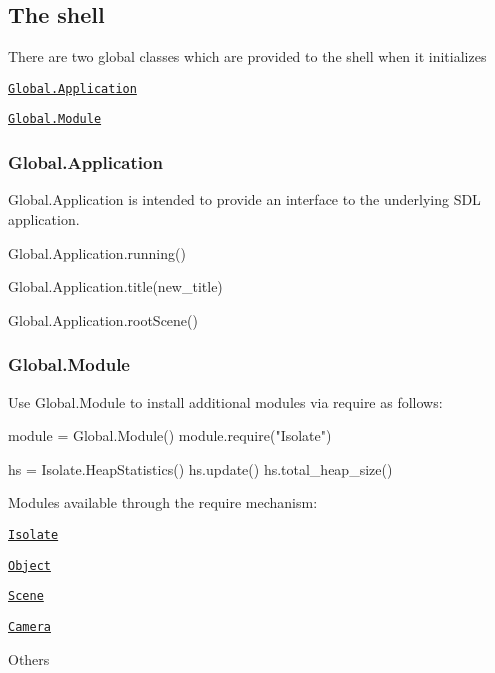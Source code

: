 \subsection*{The shell}

There are two global classes which are provided to the shell when it initializes
\begin{DoxyItemize}
\item \href{#0-global-application}{\tt Global.\+Application}
\item \href{#1-global-module}{\tt Global.\+Module}
\end{DoxyItemize}

\subsubsection*{{\ttfamily Global.\+Application}}

{\ttfamily Global.\+Application} is intended to provide an interface to the underlying S\+DL application.
\begin{DoxyItemize}
\item 
\begin{DoxyCode}
Global.Application.running()
\end{DoxyCode}

\item 
\begin{DoxyCode}
Global.Application.title(new\_title)
\end{DoxyCode}

\item 
\begin{DoxyCode}
Global.Application.rootScene()
\end{DoxyCode}

\end{DoxyItemize}

\subsubsection*{{\ttfamily Global.\+Module}}

Use {\ttfamily Global.\+Module} to install additional modules via {\ttfamily require} as follows\+:


\begin{DoxyCode}
module = Global.Module()
module.require("Isolate")

hs = Isolate.HeapStatistics()
hs.update()
hs.total\_heap\_size()
\end{DoxyCode}


Modules available through the {\ttfamily require} mechanism\+:
\begin{DoxyItemize}
\item \href{#1-isolate}{\tt {\ttfamily Isolate}}
\item \href{#2-object}{\tt {\ttfamily Object}}
\item \href{#2-scene}{\tt {\ttfamily Scene}}
\item \href{#3-camera}{\tt {\ttfamily Camera}}
\item Others
\end{DoxyItemize}





